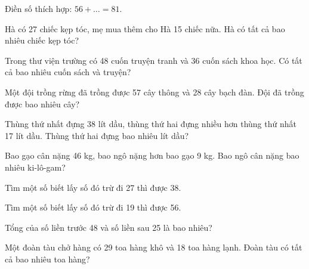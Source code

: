 \begin{ex}
Điền số thích hợp: $56 + \dots = 81$.
\end{ex}

\begin{ex}
Hà có 27 chiếc kẹp tóc, mẹ mua thêm cho Hà 15 chiếc nữa. Hà có tất cả bao nhiêu chiếc kẹp tóc?
\end{ex}

\begin{ex}
Trong thư viện trường có 48 cuốn truyện tranh và 36 cuốn sách khoa học. Có tất cả bao nhiêu cuốn sách và truyện?
\end{ex}

\begin{ex}
Một đội trồng rừng đã trồng được 57 cây thông và 28 cây bạch đàn. Đội đã trồng được bao nhiêu cây?
\end{ex}

\begin{ex}
Thùng thứ nhất đựng 38 lít dầu, thùng thứ hai đựng nhiều hơn thùng thứ nhất 17 lít dầu. Thùng thứ hai đựng bao nhiêu lít dầu?
\end{ex}

\begin{ex}
Bao gạo cân nặng 46 kg, bao ngô nặng hơn bao gạo 9 kg. Bao ngô cân nặng bao nhiêu ki-lô-gam?
\end{ex}

\begin{ex}
Tìm một số biết lấy số đó trừ đi 27 thì được 38.
\end{ex}

\begin{ex}
Tìm một số biết lấy số đó trừ đi 19 thì được 56.
\end{ex}

\begin{ex}
Tổng của số liền trước 48 và số liền sau 25 là bao nhiêu?
\end{ex}

\begin{ex}
Một đoàn tàu chở hàng có 29 toa hàng khô và 18 toa hàng lạnh. Đoàn tàu có tất cả bao nhiêu toa hàng?
\end{ex}

